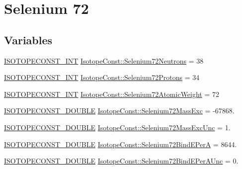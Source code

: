 \hypertarget{group___isotope_const-_selenium-_se72}{}\section{Selenium 72}
\label{group___isotope_const-_selenium-_se72}
\subsection*{Variables}
\begin{DoxyCompactItemize}
\item 
\mbox{\hyperlink{group___isotope_const-_macros_ga5f18360b3e99483a35c32d789e62621c}{I\+S\+O\+T\+O\+P\+E\+C\+O\+N\+S\+T\+\_\+\+I\+NT}} \mbox{\hyperlink{group___isotope_const-_selenium-_se72_gac887821782755eba49f25b4c381dee30}{Isotope\+Const\+::\+Selenium72\+Neutrons}} = 38
\item 
\mbox{\hyperlink{group___isotope_const-_macros_ga5f18360b3e99483a35c32d789e62621c}{I\+S\+O\+T\+O\+P\+E\+C\+O\+N\+S\+T\+\_\+\+I\+NT}} \mbox{\hyperlink{group___isotope_const-_selenium-_se72_ga010f0c852078d0b535616d7a10291dc5}{Isotope\+Const\+::\+Selenium72\+Protons}} = 34
\item 
\mbox{\hyperlink{group___isotope_const-_macros_ga5f18360b3e99483a35c32d789e62621c}{I\+S\+O\+T\+O\+P\+E\+C\+O\+N\+S\+T\+\_\+\+I\+NT}} \mbox{\hyperlink{group___isotope_const-_selenium-_se72_gadf607570f09867688b031cca12566ffc}{Isotope\+Const\+::\+Selenium72\+Atomic\+Weight}} = 72
\item 
\mbox{\hyperlink{group___isotope_const-_macros_ga8f45a7272ce02c0b4c65c44636ed719a}{I\+S\+O\+T\+O\+P\+E\+C\+O\+N\+S\+T\+\_\+\+D\+O\+U\+B\+LE}} \mbox{\hyperlink{group___isotope_const-_selenium-_se72_gaa70e1e90ab7cb26747c00a40b0adf27e}{Isotope\+Const\+::\+Selenium72\+Mass\+Exc}} = -\/67868.
\item 
\mbox{\hyperlink{group___isotope_const-_macros_ga8f45a7272ce02c0b4c65c44636ed719a}{I\+S\+O\+T\+O\+P\+E\+C\+O\+N\+S\+T\+\_\+\+D\+O\+U\+B\+LE}} \mbox{\hyperlink{group___isotope_const-_selenium-_se72_gab88c7c25ab8ad7be0fbc1a642c183a44}{Isotope\+Const\+::\+Selenium72\+Mass\+Exc\+Unc}} = 1.
\item 
\mbox{\hyperlink{group___isotope_const-_macros_ga8f45a7272ce02c0b4c65c44636ed719a}{I\+S\+O\+T\+O\+P\+E\+C\+O\+N\+S\+T\+\_\+\+D\+O\+U\+B\+LE}} \mbox{\hyperlink{group___isotope_const-_selenium-_se72_gad0fc208950e78ad24e53be6b8712296e}{Isotope\+Const\+::\+Selenium72\+Bind\+E\+PerA}} = 8644.
\item 
\mbox{\hyperlink{group___isotope_const-_macros_ga8f45a7272ce02c0b4c65c44636ed719a}{I\+S\+O\+T\+O\+P\+E\+C\+O\+N\+S\+T\+\_\+\+D\+O\+U\+B\+LE}} \mbox{\hyperlink{group___isotope_const-_selenium-_se72_ga8df34671a2d6c9833cbd52fc2353487a}{Isotope\+Const\+::\+Selenium72\+Bind\+E\+Per\+A\+Unc}} = 0.

\end{DoxyCompactItemize}
